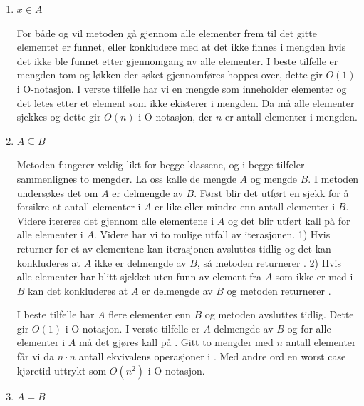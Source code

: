 \documentclass[10pt,a4paper,norsk]{article}
\begin{document}
\begin{enumerate}[leftmargin=*,itemsep=1cm,labelsep=1.5em,label=\roman*.]
    \item
        \par $x \in A$
        \par For både  og  vil metoden gå gjennom alle elementer frem til det gitte elementet er funnet, eller konkludere med at det ikke finnes i mengden hvis det ikke ble funnet etter gjennomgang av alle elementer. I beste tilfelle er mengden tom og løkken der søket gjennomføres hoppes over, dette gir $O(1)$ i O-notasjon. I verste tilfelle har vi en mengde som inneholder elementer og det letes etter et element som ikke ekisterer i mengden. Da må alle elementer sjekkes og dette gir $O(n)$ i O-notasjon, der $n$ er antall elementer i mengden.
    \item
        \par $A \subseteq B$
        \par Metoden fungerer veldig likt for begge klassene, og i begge tilfeler sammenlignes to mengder. La oss kalle de mengde $A$ og mengde $B$. I metoden undersøkes det om $A$ er delmengde av $B$. Først blir det utført en sjekk for å forsikre at antall elementer i $A$ er like eller mindre enn antall elementer i $B$. Videre itereres det gjennom alle elementene i $A$ og det blir utført kall på  for alle elementer i $A$. Videre har vi to mulige utfall av iterasjonen. 1) Hvis  returner  for et av elementene kan iterasjonen avsluttes tidlig og det kan konkluderes at $A$ \underline{ikke} er delmengde av $B$, så metoden returnerer . 2) Hvis alle elementer har blitt sjekket uten funn av element fra $A$ som ikke er med i $B$ kan det konkluderes at $A$ er delmengde av $B$ og metoden returnerer .
        \par I beste tilfelle har $A$ flere elementer enn $B$ og metoden avsluttes tidlig. Dette gir $O(1)$ i O-notasjon. I verste tilfelle er $A$ delmengde av $B$ og for alle elementer i $A$ må det gjøres kall på . Gitt to mengder med $n$ antall elementer får vi da $n \cdot n$ antall ekvivalens operasjoner i . Med andre ord en worst case kjøretid uttrykt som $O(n^2)$ i O-notasjon.
    \item
        \par $A = B$

\end{enumerate}
\end{document}
